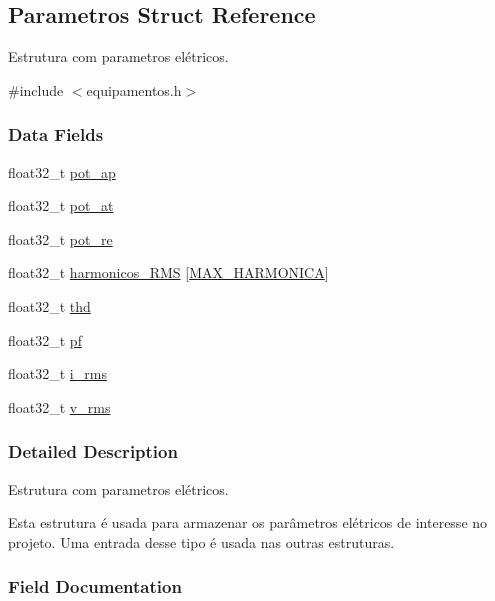 \hypertarget{struct_parametros}{}\subsection{Parametros Struct Reference}
\label{struct_parametros}


Estrutura com parametros elétricos.  




{\ttfamily \#include $<$equipamentos.\+h$>$}

\subsubsection*{Data Fields}
\begin{DoxyCompactItemize}
\item 
float32\+\_\+t \hyperlink{struct_parametros_a08c522040c18468c41e5c674b1327464}{pot\+\_\+ap}
\item 
float32\+\_\+t \hyperlink{struct_parametros_a2aa10811f3673de8c32edb10c1be6f4c}{pot\+\_\+at}
\item 
float32\+\_\+t \hyperlink{struct_parametros_a4071680ad8007b59548cc410e787d0dd}{pot\+\_\+re}
\item 
float32\+\_\+t \hyperlink{struct_parametros_ac1920f23f505aaf715f96d84c96d0912}{harmonicos\+\_\+\+R\+MS} \mbox{[}\hyperlink{defines_8h_a21e24b95b94f5365ae4b50fc716a838d}{M\+A\+X\+\_\+\+H\+A\+R\+M\+O\+N\+I\+CA}\mbox{]}
\item 
float32\+\_\+t \hyperlink{struct_parametros_a4e36f55c7b475c21cf92002411381ed8}{thd}
\item 
float32\+\_\+t \hyperlink{struct_parametros_ac868390d99feaa32f9472b70a1074749}{pf}
\item 
float32\+\_\+t \hyperlink{struct_parametros_a66cc01ebf95eb4de14f446a51fc6ed78}{i\+\_\+rms}
\item 
float32\+\_\+t \hyperlink{struct_parametros_a76e107321890a99343c7331bd0a9aeff}{v\+\_\+rms}
\end{DoxyCompactItemize}


\subsubsection{Detailed Description}
Estrutura com parametros elétricos. 

Esta estrutura é usada para armazenar os parâmetros elétricos de interesse no projeto. Uma entrada desse tipo é usada nas outras estruturas. 

\subsubsection{Field Documentation}
\mbox{\label{struct_parametros_ac1920f23f505aaf715f96d84c96d0912}} 
